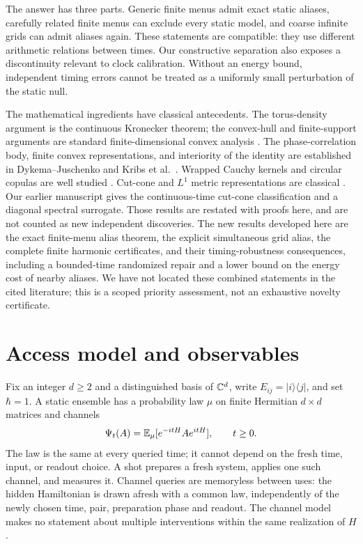 \documentclass[11pt,a4paper]{article}
\theoremstyle{remark}\newtheorem{remark}[theorem]{Remark}
\begin{document}
The answer has three parts. Generic finite menus admit exact static
aliases, carefully related finite menus can exclude every static model,
and coarse infinite grids can admit aliases again. These statements are
compatible: they use different arithmetic relations between times.
Our constructive separation also exposes a discontinuity relevant to
clock calibration. Without an energy bound, independent timing errors
cannot be treated as a uniformly small perturbation of the static null.

The mathematical ingredients have classical antecedents. The torus-density
argument is the continuous Kronecker theorem; the convex-hull and
finite-support arguments are standard finite-dimensional convex analysis
\cite{vdh,rockafellar}. The phase-correlation body, finite convex
representations, and interiority of the identity are established in
Dykema--Juschenko \cite[Proposition 2.5, Remark 2.7, Section 4]{dykema}
and Kribs et al.\ \cite[Theorem 27, Remark 28]{kribs}.
Wrapped Cauchy kernels and circular copulas are
well studied \cite{kato}. Cut-cone and $L^1$ metric representations are
classical \cite[Chapter 4, pp.\ 37--52]{deza}. Our earlier manuscript \cite{parent} gives the
continuous-time cut-cone classification and a diagonal spectral surrogate.
Those results are restated with proofs here, and are not counted as new
independent discoveries. The new results developed here are the exact
finite-menu alias theorem, the explicit simultaneous grid alias, the
complete finite harmonic certificates, and their timing-robustness
consequences, including a bounded-time randomized repair and a lower
bound on the energy cost of nearby aliases. We have not located these combined statements in the cited
literature; this is a scoped priority assessment, not an exhaustive
novelty certificate.

\section{Access model and observables}\label{sec:model}
Fix an integer $d\geq2$ and a distinguished basis of $\mathbb C^d$, write $E_{ij}=|i\rangle\langle j|$,
and set $\hbar=1$. A static ensemble has a probability law $\mu$ on
finite Hermitian $d\times d$ matrices and channels
\begin{equation}\label{eq:static}
 \Psi_t(A)=\mathbb E_\mu[e^{-itH}A e^{itH}],\qquad t\geq0.
\end{equation}
The law is the same at every queried time; it cannot depend on the fresh
time, input, or readout choice. A shot prepares a fresh system, applies
one such channel, and measures it. Channel queries are memoryless between
uses: the hidden Hamiltonian is drawn afresh with a common law, independently
of the newly chosen time, pair, preparation phase and readout. The channel model makes no statement
about multiple interventions within the same realization of $H$.
\end{document}
